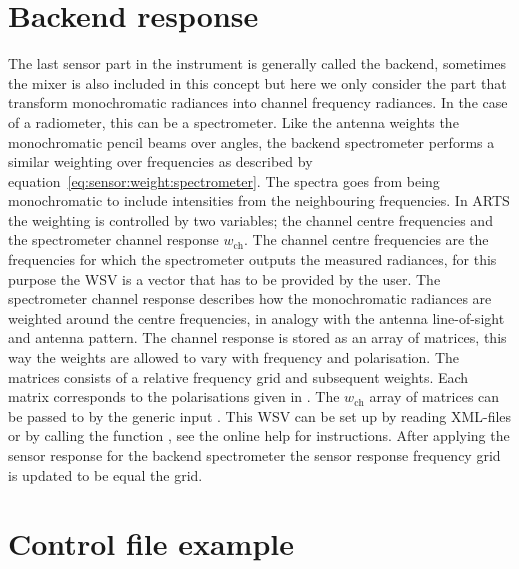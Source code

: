\section{Backend response}
\label{sec:sensor:backend}
The last sensor part in the instrument is generally called the backend, sometimes the mixer is also included in this concept but here we only consider the part that transform monochromatic radiances into channel frequency radiances. In the case of a radiometer, this can be a spectrometer. Like the antenna weights the monochromatic pencil beams over angles, the backend spectrometer performs a similar weighting over frequencies as described by equation~\ref{eq:sensor:weight:spectrometer}. The spectra goes from being monochromatic to include intensities from the neighbouring frequencies. 
In ARTS the weighting is controlled by two variables; the channel centre frequencies  and the spectrometer channel response $w_\mathrm{ch}$. The channel centre frequencies are the frequencies for which  the spectrometer outputs the measured radiances, for this purpose the WSV  is a vector that has to be provided by the user.
The spectrometer channel response describes how the monochromatic radiances are weighted around the centre frequencies, in analogy with the antenna line-of-sight and antenna pattern. The channel response is stored as an array of matrices, this way the weights are allowed to vary with frequency and polarisation. The matrices consists of a relative frequency grid and subsequent weights. Each matrix corresponds to the polarisations given in . The $w_\mathrm{ch}$ array of matrices can be passed to  by the generic input . This WSV can be set up by reading XML-files or by calling the function , see the online help for instructions.
After applying the sensor response for the backend spectrometer the sensor response frequency grid is updated to be equal the  grid.
% 
% 


\section{Control file example}


